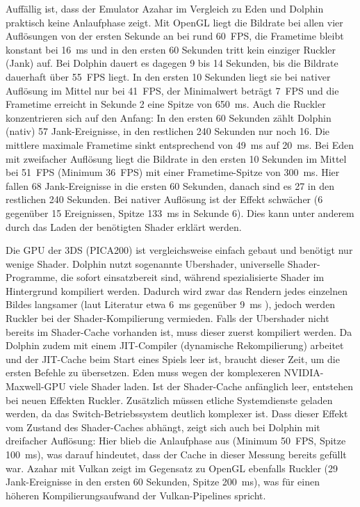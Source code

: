 \documentclass[12pt,a4paper]{scrartcl}
\begin{document}
Auffällig ist, dass der Emulator Azahar im Vergleich zu Eden und Dolphin praktisch keine Anlaufphase zeigt.
Mit OpenGL liegt die Bildrate bei allen vier Auflösungen von der ersten Sekunde an bei rund 60~FPS,
die Frametime bleibt konstant bei 16~ms und in den ersten 60 Sekunden tritt kein einziger Ruckler (Jank) auf.
Bei Dolphin dauert es dagegen 9 bis 14 Sekunden, bis die Bildrate dauerhaft über 55~FPS liegt.
In den ersten 10 Sekunden liegt sie bei nativer Auflösung im Mittel nur bei 41~FPS, der Minimalwert beträgt 7~FPS
und die Frametime erreicht in Sekunde 2 eine Spitze von 650~ms.
Auch die Ruckler konzentrieren sich auf den Anfang: In den ersten 60 Sekunden zählt Dolphin (nativ) 57 Jank-Ereignisse, in den restlichen 240 Sekunden nur noch 16.
Die mittlere maximale Frametime sinkt entsprechend von 49~ms auf 20~ms.
Bei Eden mit zweifacher Auflösung liegt die Bildrate in den ersten 10 Sekunden im Mittel bei 51~FPS (Minimum 36~FPS) mit einer Frametime-Spitze von 300~ms.
Hier fallen 68 Jank-Ereignisse in die ersten 60 Sekunden, danach sind es 27 in den restlichen 240 Sekunden.
Bei nativer Auflösung ist der Effekt schwächer (6 gegenüber 15 Ereignissen, Spitze 133~ms in Sekunde 6).
Dies kann unter anderem durch das Laden der benötigten Shader erklärt werden.

Die GPU der 3DS (PICA200) ist vergleichsweise einfach gebaut und benötigt nur wenige Shader.
Dolphin nutzt sogenannte Ubershader, universelle Shader-Programme, die sofort einsatzbereit sind, während spezialisierte Shader im Hintergrund kompiliert werden.
Dadurch wird zwar das Rendern jedes einzelnen Bildes langsamer (laut Literatur etwa 6~ms gegenüber 9~ms \cite{QUELLE}), jedoch werden Ruckler bei der Shader-Kompilierung vermieden.
Falls der Ubershader nicht bereits im Shader-Cache vorhanden ist, muss dieser zuerst kompiliert werden.
Da Dolphin zudem mit einem JIT-Compiler (dynamische Rekompilierung) arbeitet und der JIT-Cache beim Start eines Spiels leer ist, braucht dieser Zeit, um die ersten Befehle zu übersetzen.
Eden muss wegen der komplexeren NVIDIA-Maxwell-GPU viele Shader laden.
Ist der Shader-Cache anfänglich leer, entstehen bei neuen Effekten Ruckler.
Zusätzlich müssen etliche Systemdienste geladen werden, da das Switch-Betriebssystem deutlich komplexer ist.
Dass dieser Effekt vom Zustand des Shader-Caches abhängt, zeigt sich auch bei Dolphin mit dreifacher Auflösung: Hier blieb die Anlaufphase aus (Minimum 50~FPS, Spitze 100~ms),
was darauf hindeutet, dass der Cache in dieser Messung bereits gefüllt war.
Azahar mit Vulkan zeigt im Gegensatz zu OpenGL ebenfalls Ruckler (29 Jank-Ereignisse in den ersten 60 Sekunden, Spitze 200~ms),
was für einen höheren Kompilierungsaufwand der Vulkan-Pipelines spricht.
\end{document}
